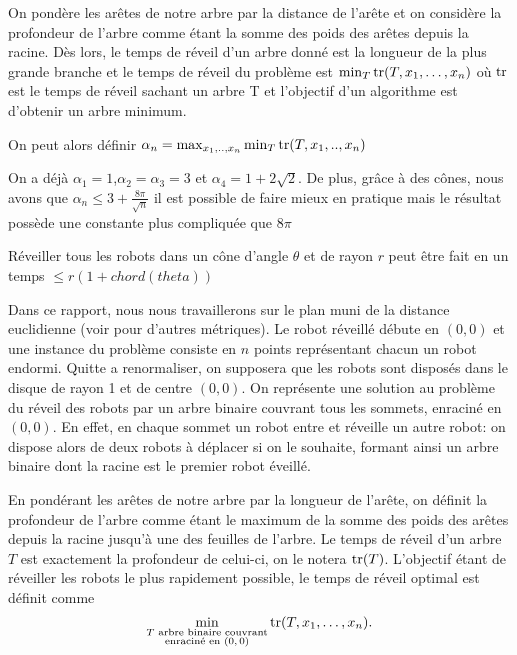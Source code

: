 On pondère les arêtes de notre arbre par la distance de l'arête et on considère la profondeur de l'arbre comme étant la somme des poids des arêtes depuis la racine. Dès lors, le temps de réveil d'un arbre donné est la longueur de la plus grande branche et le temps de réveil du problème est $\min_{T} \operatorname{tr}(T, x_1, \dots, x_n)$ où $\operatorname{tr}$ est le temps de réveil sachant un arbre T et l'objectif d'un algorithme est d'obtenir un arbre minimum.

On peut alors définir $\alpha_n = \max_{x_1, .., x_n} \min_T \operatorname{tr}(T, x_1, ..,
x_n)$

On a déjà $\alpha_1 = 1$,$\alpha_2 = \alpha_3 = 3$ et $\alpha_4 = 1 + 2\sqrt{2}$. De plus, grâce à des cônes, nous avons que $\alpha_n \leq 3 + \frac{8\pi}{\sqrt{n}}$ il est possible de faire mieux en pratique mais le résultat possède une constante plus compliquée que $8\pi$

\begin{theorem}
  Réveiller tous les robots dans un cône d'angle $\theta$ et de rayon $r$
  peut être fait en un temps $\leq r(1 + chord(theta))$
\end{theorem}



Dans ce rapport, nous nous travaillerons sur le plan muni de la distance
euclidienne (voir \cite{} pour d'autres métriques). Le robot réveillé débute en
$(0,0)$ et une instance du problème consiste en $n$ points représentant chacun
un robot endormi. Quitte a renormaliser, on supposera que les robots sont
disposés dans le disque de rayon 1 et de centre $(0,0)$. On représente une
solution au problème du réveil des robots par un arbre binaire couvrant tous les
sommets, enraciné en $(0, 0)$. En effet, en chaque sommet un robot entre et
réveille un autre robot: on dispose alors de deux robots à déplacer si on le
souhaite, formant ainsi un arbre binaire dont la racine est le premier robot
éveillé.

En pondérant les arêtes de notre arbre par la longueur de l'arête, on définit la
profondeur de l'arbre comme étant le maximum de la somme des poids des arêtes
depuis la racine jusqu'à une des feuilles de l'arbre. Le temps de réveil d'un
arbre $T$ est exactement la profondeur de celui-ci, on le notera
$\operatorname{tr}(T)$. L'objectif étant de réveiller les robots le plus rapidement possible,
le temps de réveil optimal est définit comme
$$\min_{\substack{T \text{ arbre binaire couvrant}\\ \text{enraciné en $(0,0)$}}} \operatorname{tr}(T, x_1, \dots,
  x_n).$$

